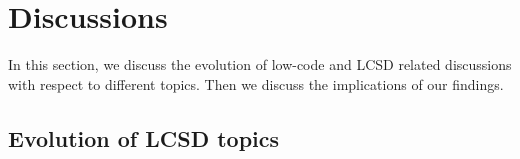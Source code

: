 \section{Discussions} \label{sec:discussion}
In this section, we discuss the evolution of low-code and LCSD related discussions with respect to different topics. Then we discuss the implications of our findings. 


\subsection{Evolution of LCSD topics}


